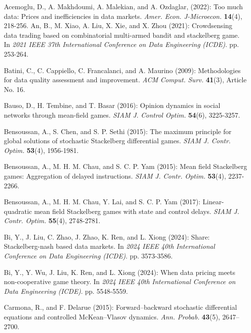\documentclass[11pt]{article}
\numberwithin{equation}{section}
\begin{document}
	
	\begin{thebibliography}{}
	{\small	
        Acemoglu, D., A. Makhdoumi, A. Malekian, and A. Ozdaglar, (2022): Too much data: Prices and inefficiencies in data markets. {\it Amer. Econ. J-Microecon.} {\bf 14}(4), 218-256.
		An, B., M. Xiao, A. Liu, X. Xie, and X. Zhou (2021): Crowdsensing data trading based on combinatorial multi-armed bandit and stackelberg game. In {\it 2021 IEEE 37th International Conference on Data Engineering (ICDE)}. pp. 253-264.
		
		Batini, C., C. Cappiello, C. Francalanci, and A. Maurino (2009): Methodologies for data quality assessment and improvement. {\it ACM Comput. Surv.} {\bf 41}(3), Article No. 16.	
		
		Bauso, D., H. Tembine, and T. Basar (2016): Opinion dynamics in social networks through mean-field games. {\it SIAM J. Control Optim.} {\bf 54}(6), 3225-3257.
		
		Bensoussan, A., S. Chen, and S. P. Sethi (2015): The maximum principle for global solutions of stochastic Stackelberg differential games. {\it SIAM J. Contr. Optim.} {\bf 53}(4), 1956-1981.
		
		Bensoussan, A., M. H. M. Chau, and S. C. P. Yam (2015): Mean field Stackelberg games: Aggregation of delayed instructions. {\it SIAM J. Contr. Optim.} {\bf 53}(4), 2237-2266.
		
		Bensoussan, A., M. H. M. Chau, Y. Lai, and S. C. P. Yam (2017): Linear-quadratic mean field Stackelberg games with state and control delays. {\it SIAM J. Contr. Optim.} {\bf 55}(4), 2748-2781.
		
		Bi, Y., J. Liu, C. Zhao, J. Zhao, K. Ren, and L. Xiong (2024): Share: Stackelberg-nash based data markets. In {\it 2024 IEEE 40th International Conference on Data Engineering (ICDE)}. pp. 3573-3586.
		
		Bi, Y., Y. Wu, J. Liu, K. Ren, and L. Xiong (2024): When data pricing meets non-cooperative game theory. In {\it 2024 IEEE 40th International Conference on Data Engineering (ICDE)}. pp. 5548-5559.
		
		Carmona, R., and F. Delarue (2015): Forward–backward stochastic differential equations and controlled McKean–Vlasov dynamics. {\it Ann. Probab.} {\bf 43}(5), 2647–2700.
		
}
\end{thebibliography}
\end{document}
